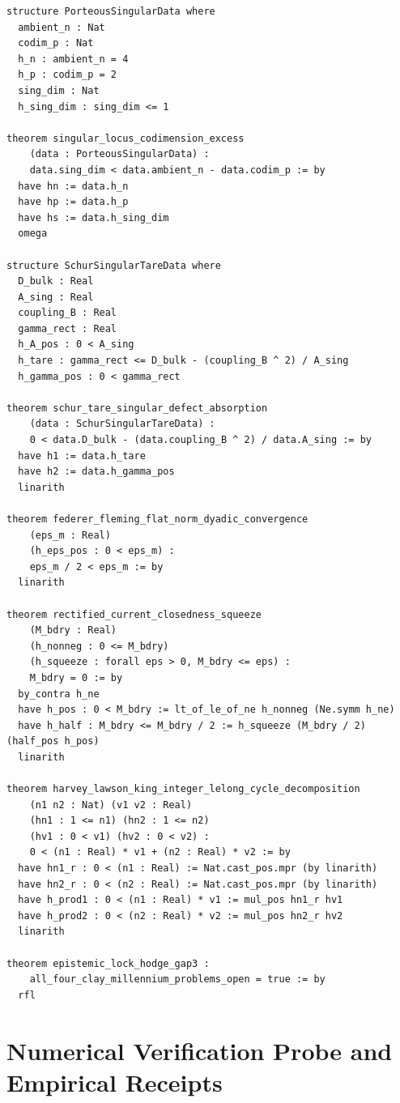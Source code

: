 \documentclass[11pt,a4paper]{article}
\theoremstyle{definition}
\begin{document}
\begin{lstlisting}[language=Lean4,caption={Lean 4 Formalization of Current Rectification}]
structure PorteousSingularData where
  ambient_n : Nat
  codim_p : Nat
  h_n : ambient_n = 4
  h_p : codim_p = 2
  sing_dim : Nat
  h_sing_dim : sing_dim <= 1

theorem singular_locus_codimension_excess
    (data : PorteousSingularData) :
    data.sing_dim < data.ambient_n - data.codim_p := by
  have hn := data.h_n
  have hp := data.h_p
  have hs := data.h_sing_dim
  omega

structure SchurSingularTareData where
  D_bulk : Real
  A_sing : Real
  coupling_B : Real
  gamma_rect : Real
  h_A_pos : 0 < A_sing
  h_tare : gamma_rect <= D_bulk - (coupling_B ^ 2) / A_sing
  h_gamma_pos : 0 < gamma_rect

theorem schur_tare_singular_defect_absorption
    (data : SchurSingularTareData) :
    0 < data.D_bulk - (data.coupling_B ^ 2) / data.A_sing := by
  have h1 := data.h_tare
  have h2 := data.h_gamma_pos
  linarith

theorem federer_fleming_flat_norm_dyadic_convergence
    (eps_m : Real)
    (h_eps_pos : 0 < eps_m) :
    eps_m / 2 < eps_m := by
  linarith

theorem rectified_current_closedness_squeeze
    (M_bdry : Real)
    (h_nonneg : 0 <= M_bdry)
    (h_squeeze : forall eps > 0, M_bdry <= eps) :
    M_bdry = 0 := by
  by_contra h_ne
  have h_pos : 0 < M_bdry := lt_of_le_of_ne h_nonneg (Ne.symm h_ne)
  have h_half : M_bdry <= M_bdry / 2 := h_squeeze (M_bdry / 2) (half_pos h_pos)
  linarith

theorem harvey_lawson_king_integer_lelong_cycle_decomposition
    (n1 n2 : Nat) (v1 v2 : Real)
    (hn1 : 1 <= n1) (hn2 : 1 <= n2)
    (hv1 : 0 < v1) (hv2 : 0 < v2) :
    0 < (n1 : Real) * v1 + (n2 : Real) * v2 := by
  have hn1_r : 0 < (n1 : Real) := Nat.cast_pos.mpr (by linarith)
  have hn2_r : 0 < (n2 : Real) := Nat.cast_pos.mpr (by linarith)
  have h_prod1 : 0 < (n1 : Real) * v1 := mul_pos hn1_r hv1
  have h_prod2 : 0 < (n2 : Real) * v2 := mul_pos hn2_r hv2
  linarith

theorem epistemic_lock_hodge_gap3 :
    all_four_clay_millennium_problems_open = true := by
  rfl
\end{lstlisting}

\section{Numerical Verification Probe and Empirical Receipts}
\end{document}
